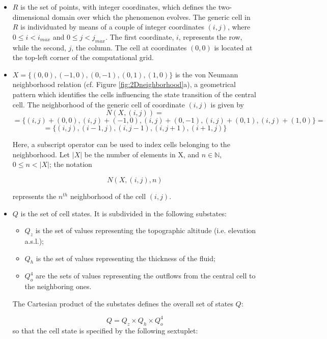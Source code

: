 \begin{itemize}
	
	\item $R$ is the set of points, with integer coordinates, which
	defines the two-dimensional domain over which the phenomenon
	evolves. The generic cell in $R$ is individuated by means of a
	couple of integer coordinates $(i, j)$, where $0 \leq i < i_{max}$
	and $0 \leq j < j_{max}$. The first coordinate, $i$, represents
	the row, while the second, $j$, the column. The cell at
	coordinates $(0,0)$ is located at the top-left corner of the
	computational grid.
	
	\item $X = \{(0,0), (-1, 0), (0, -1), (0, 1), (1, 0)\}$ is the von
	Neumann neighborhood relation (cf. Figure
	\ref{fig:2Dneighborhood}a), a geometrical pattern which identifies
	the cells influencing the state transition of the central
	cell. The neighborhood of the generic cell of coordinate $(i, j)$
	is given by
	$$N(X, (i, j)) =$$
	$$= \{(i, j)+(0,0), (i, j)+(-1, 0), (i, j)+(0, -1), (i, j)+(0, 1),
	(i, j)+(1, 0)\} =$$
	$$= \{(i, j), (i-1, j), (i, j-1), (i, j+1), (i+1, j)\}$$
	
	Here, a subscript operator can be used to index cells belonging to
	the neighborhood. Let $|X|$ be the number of elements in X, and $n
	\in \mathbb{N}$, $0 \leq n < |X|$; the notation
	
	$$N(X, (i, j), n)$$
	
	represents the $n^{th}$ neighborhood of the cell $(i,j)$.
	
	\item $Q$ is the set of cell states. It is subdivided in the
	following substates:
	
	\begin{itemize}
		\item $Q_z$ is the set of values representing the topographic
		altitude (i.e. elevation a.s.l.);
		\item $Q_h$ is the set of values representing the thickness of the
		fluid;
		\item $Q_o^4$ are the sets of values representing the outflows
		from the central cell to the neighboring ones.
	\end{itemize}
	
	The Cartesian product of the substates defines the overall set of
	states $Q$:
	
	$$Q = Q_z \times Q_h \times Q_o^4$$ so that the cell state is
	specified by the following sextuplet:
	

\end{itemize}
